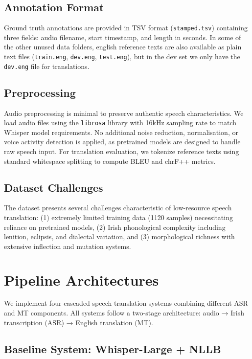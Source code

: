 \documentclass[11pt]{article}
\begin{document}
\subsection{Annotation Format}

Ground truth annotations are provided in TSV format (\texttt{stamped.tsv}) containing three fields: audio filename, start timestamp, and length in seconds. 
In some of the other unused data folders, english reference texts are also available as plain text files (\texttt{train.eng}, \texttt{dev.eng}, \texttt{test.eng}), but in the dev 
set we only have the \texttt{dev.eng} file for translations.

\subsection{Preprocessing}

Audio preprocessing is minimal to preserve authentic speech characteristics. We load audio files using the \texttt{librosa} library with 16kHz sampling rate to match 
Whisper model requirements. No additional noise reduction, normalisation, or voice activity detection is applied, as pretrained models are designed to handle raw speech input. 
For translation evaluation, we tokenize reference texts using standard whitespace splitting to compute BLEU and chrF++ metrics.

\subsection{Dataset Challenges}

The dataset presents several challenges characteristic of low-resource speech translation: (1) extremely limited training data (1120 samples) necessitating reliance on 
pretrained models, (2) Irish phonological complexity including lenition, eclipsis, and dialectal variation, and (3) morphological richness with extensive inflection and mutation 
systems.


\section{Pipeline Architectures}

We implement four cascaded speech translation systems combining different ASR and MT components. All systems follow a two-stage architecture: audio → Irish transcription (ASR) → English 
translation (MT).

\subsection{Baseline System: Whisper-Large + NLLB}
\end{document}
